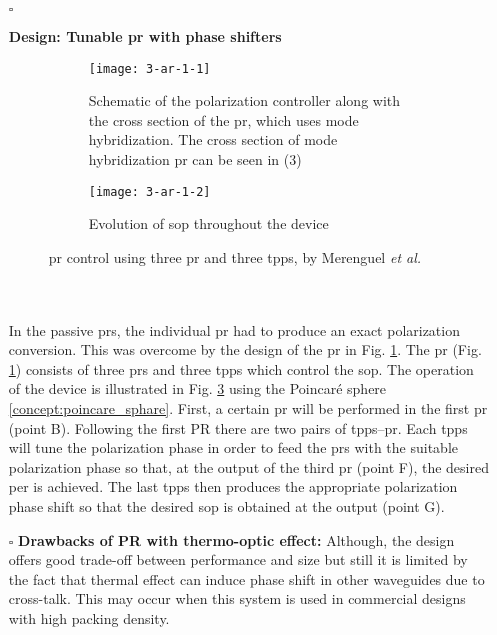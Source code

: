 \documentclass[../report.tex]{subfiles}
\begin{document}
	\begin{itemize}[leftmargin=*]
		
		\item[$\square$]\begin{minipage}[t]{\textwidth}\textbf{Design: Tunable \gls{pr} with phase shifters}
		\begin{figure}[H] %
			\begin{subfigure}[t]{0.45\textwidth}
				\texttt{[image: 3-ar-1-1]}
				\caption{Schematic of the polarization controller along with the cross section of the \gls{pr}, which uses mode hybridization. The cross section of mode hybridization \gls{pr} can be seen in (3)}
				\label{fig:3_ar_1_1}
			\end{subfigure}
			\hfill
			\begin{subfigure}[t]{0.45\textwidth}
				\texttt{[image: 3-ar-1-2]}
				\caption{Evolution of \gls{sop} throughout the device}
				\label{fig:3_ar_1_2}
			\end{subfigure}
			\caption{\gls{pr} control using three \gls{pr} and three \gls{tpps}, by Merenguel \textit{et al.} \cite{sarmiento-merenguel_demonstration_2015}}
		\end{figure}
		\end{minipage}\\\\
		\noindent In the passive \gls{pr}s, the individual \gls{pr} had to produce an exact polarization conversion. This was overcome by the design of the \gls{pr} in Fig. \ref{fig:3_ar_1_1}. The \gls{pr} (Fig. \ref{fig:3_ar_1_1}) consists of three \gls{pr}s and three \gls{tpps} which control the \gls{sop}. The operation of the device is illustrated in Fig. \ref{fig:3_ar_1_2} using the Poincaré sphere \ref{concept:poincare_sphare}. First, a certain \gls{pr} will be performed in the first \gls{pr} (point B). Following the first PR there are two pairs of \gls{tpps}–\gls{pr}. Each \gls{tpps} will tune the polarization phase in order to feed the \gls{pr}s with the suitable polarization phase so that, at the output of the third \gls{pr} (point F), the desired \gls{per} is achieved. The last \gls{tpps} then produces the appropriate polarization phase shift so that the desired \gls{sop} is obtained at the output (point G).
		
		\item[$\square$] \textbf{Drawbacks of PR with thermo-optic effect:}
		Although, the design offers good trade-off between performance and size but still it is limited by the fact that thermal effect can induce phase shift in other waveguides due to cross-talk. This may occur when this system is used in commercial designs with high packing density.
		

\end{itemize}
\end{document}
